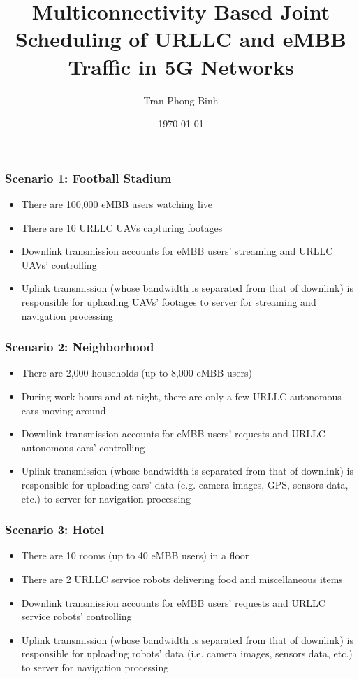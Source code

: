 \documentclass{beamer}
\title{Multiconnectivity Based Joint Scheduling of URLLC and eMBB Traffic in 5G Networks}
\author{Tran Phong Binh}
\institute{Department of Computer Science, National Tsing Hua University}
\date{\today}
\begin{document}
\begin{frame}
  \titlepage
\end{frame}

\begin{frame}
  \frametitle{Scenario 1: Football Stadium}
  \begin{itemize}
    \item There are 100,000 eMBB users watching live
    \item There are 10 URLLC UAVs capturing footages
    \item Downlink transmission accounts for eMBB users' streaming and URLLC UAVs' controlling
    \item Uplink transmission (whose bandwidth is separated from that of downlink) is responsible for uploading UAVs' footages to server for streaming and navigation processing
  \end{itemize}
\end{frame}

\begin{frame}
  \frametitle{Scenario 2: Neighborhood}
  \begin{itemize}
    \item There are 2,000 households (up to 8,000 eMBB users)
    \item During work hours and at night, there are only a few URLLC autonomous cars moving around
    \item Downlink transmission accounts for eMBB users' requests and URLLC autonomous cars' controlling
    \item Uplink transmission (whose bandwidth is separated from that of downlink) is responsible for uploading cars' data (e.g. camera images, GPS, sensors data, etc.) to server for navigation processing
  \end{itemize}
\end{frame}

\begin{frame}
  \frametitle{Scenario 3: Hotel}
  \begin{itemize}
    \item There are 10 rooms (up to 40 eMBB users) in a floor
    \item There are 2 URLLC service robots delivering food and miscellaneous items
    \item Downlink transmission accounts for eMBB users' requests and URLLC service robots' controlling
    \item Uplink transmission (whose bandwidth is separated from that of downlink) is responsible for uploading robots' data (i.e. camera images, sensors data, etc.) to server for navigation processing
  \end{itemize}
\end{frame}
\end{document}
